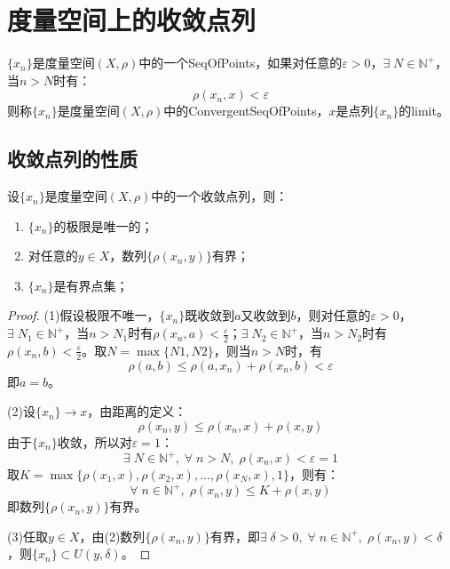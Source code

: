\section{度量空间上的收敛点列}
\begin{definition}\label{def:convergence of range of points}
	$\{x_n\}$是度量空间$(X,\rho)$中的一个\gls{SeqOfPoints}，如果对任意的$\varepsilon>0$，$\exists\; N\in\mathbb{N}^+$，当$n>N$时有：
	\begin{equation*}
		\rho(x_n,x)<\varepsilon
	\end{equation*}
	则称$\{x_n\}$是度量空间$(X,\rho)$中的\gls{ConvergentSeqOfPoints}，$x$是点列$\{x_n\}$的\gls{limit}。
\end{definition}
\subsection*{收敛点列的性质}
\begin{property}
	设$\{x_n\}$是度量空间$(X,\rho)$中的一个收敛点列，则：
	\begin{enumerate}
		\item $\{x_n\}$的极限是唯一的；
		\item 对任意的$ y\in X$，数列$\{\rho(x_n,y)\}$有界；
		\item $\{x_n\}$是有界点集；
	\end{enumerate}
\end{property}
\begin{proof}
	(1)假设极限不唯一，$\{x_n\}$既收敛到$a$又收敛到$b$，则对任意的$\varepsilon>0$，$\exists\; N_1\in\mathbb{N}^+$，当$n>N_1$时有$\rho(x_n,a)<\frac{\varepsilon}{2}$；$\exists\; N_2\in\mathbb{N}^+$，当$n>N_2$时有$\rho(x_n,b)<\frac{\varepsilon}{2}$。取$N=\max\{N1,N2\}$，则当$n>N$时，有
	\begin{equation*}
		\rho(a,b)\leqslant\rho(a,x_n)+\rho(x_n,b)<\varepsilon
	\end{equation*}
	即$a=b$。\par
	(2)设$\{x_n\}\to x$，由距离的定义：
	\begin{equation*}
		\rho(x_n,y)\leqslant\rho(x_n,x)+\rho(x,y)
	\end{equation*}
	由于$\{x_n\}$收敛，所以对$\varepsilon=1$：
	\begin{equation*}
		\exists\;N\in\mathbb{N}^+,\;\forall\;n>N,\;\rho(x_n,x)<\varepsilon=1
	\end{equation*}
	取$K=\max\{\rho(x_1,x),\rho(x_2,x),\dots,\rho(x_N,x),1\}$，则有：
	\begin{equation*}
		\forall\;n\in\mathbb{N}^+,\;\rho(x_n,y)\leqslant K+\rho(x,y)
	\end{equation*}
	即数列$\{\rho(x_n,y)\}$有界。\par
	(3)任取$y\in X$，由(2)数列$\{\rho(x_n,y)\}$有界，即$\exists\;\delta>0,\;\forall\;n\in\mathbb{N}^+,\;\rho(x_n,y)<\delta$，则$\{x_n\}\subset U(y,\delta)$。
\end{proof}
